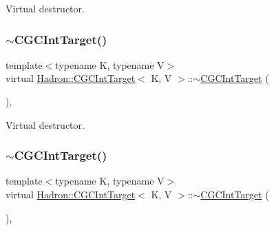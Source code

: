 Virtual destructor. 

\mbox{\label{classHadron_1_1CGCIntTarget_a6b808ca161d3dae62109495144178541}} 
\subsubsection{\texorpdfstring{$\sim$CGCIntTarget()}{~CGCIntTarget()}\hspace{0.1cm}{\footnotesize\ttfamily [2/3]}}
{\footnotesize\ttfamily template$<$typename K, typename V$>$ \\
virtual \mbox{\hyperlink{classHadron_1_1CGCIntTarget}{Hadron\+::\+C\+G\+C\+Int\+Target}}$<$ K, V $>$\+::$\sim$\mbox{\hyperlink{classHadron_1_1CGCIntTarget}{C\+G\+C\+Int\+Target}} (\begin{DoxyParamCaption}{ }\end{DoxyParamCaption})\hspace{0.3cm}{\ttfamily [inline]}, {\ttfamily [virtual]}}



Virtual destructor. 

\mbox{\label{classHadron_1_1CGCIntTarget_a6b808ca161d3dae62109495144178541}} 
\subsubsection{\texorpdfstring{$\sim$CGCIntTarget()}{~CGCIntTarget()}\hspace{0.1cm}{\footnotesize\ttfamily [3/3]}}
{\footnotesize\ttfamily template$<$typename K, typename V$>$ \\
virtual \mbox{\hyperlink{classHadron_1_1CGCIntTarget}{Hadron\+::\+C\+G\+C\+Int\+Target}}$<$ K, V $>$\+::$\sim$\mbox{\hyperlink{classHadron_1_1CGCIntTarget}{C\+G\+C\+Int\+Target}} (\begin{DoxyParamCaption}{ }\end{DoxyParamCaption})\hspace{0.3cm}{\ttfamily [inline]}, {\ttfamily [virtual]}}



